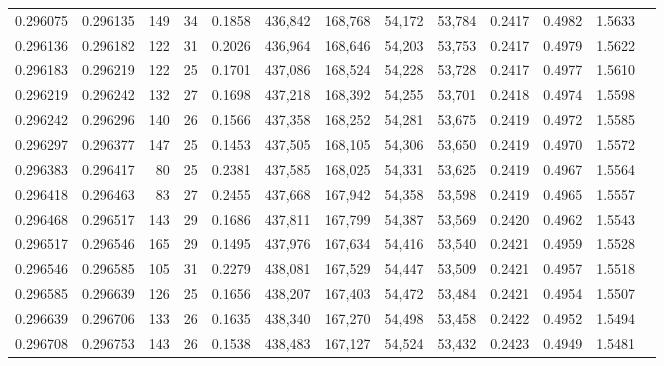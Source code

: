 \begin{tabular}{rrrrrrrrrrrrr}
0.296075 & 0.296135 &   149 &  34 &                                     0.1858 & 436,842 & 168,768 &  54,172 &  53,784 & 0.2417 & 0.4982 & 1.5633 \\
0.296136 & 0.296182 &   122 &  31 &                                     0.2026 & 436,964 & 168,646 &  54,203 &  53,753 & 0.2417 & 0.4979 & 1.5622 \\
0.296183 & 0.296219 &   122 &  25 &                                     0.1701 & 437,086 & 168,524 &  54,228 &  53,728 & 0.2417 & 0.4977 & 1.5610 \\
0.296219 & 0.296242 &   132 &  27 &                                     0.1698 & 437,218 & 168,392 &  54,255 &  53,701 & 0.2418 & 0.4974 & 1.5598 \\
0.296242 & 0.296296 &   140 &  26 &                                     0.1566 & 437,358 & 168,252 &  54,281 &  53,675 & 0.2419 & 0.4972 & 1.5585 \\
0.296297 & 0.296377 &   147 &  25 &                                     0.1453 & 437,505 & 168,105 &  54,306 &  53,650 & 0.2419 & 0.4970 & 1.5572 \\
0.296383 & 0.296417 &    80 &  25 &                                     0.2381 & 437,585 & 168,025 &  54,331 &  53,625 & 0.2419 & 0.4967 & 1.5564 \\
0.296418 & 0.296463 &    83 &  27 &                                     0.2455 & 437,668 & 167,942 &  54,358 &  53,598 & 0.2419 & 0.4965 & 1.5557 \\
0.296468 & 0.296517 &   143 &  29 &                                     0.1686 & 437,811 & 167,799 &  54,387 &  53,569 & 0.2420 & 0.4962 & 1.5543 \\
0.296517 & 0.296546 &   165 &  29 &                                     0.1495 & 437,976 & 167,634 &  54,416 &  53,540 & 0.2421 & 0.4959 & 1.5528 \\
0.296546 & 0.296585 &   105 &  31 &                                     0.2279 & 438,081 & 167,529 &  54,447 &  53,509 & 0.2421 & 0.4957 & 1.5518 \\
0.296585 & 0.296639 &   126 &  25 &                                     0.1656 & 438,207 & 167,403 &  54,472 &  53,484 & 0.2421 & 0.4954 & 1.5507 \\
0.296639 & 0.296706 &   133 &  26 &                                     0.1635 & 438,340 & 167,270 &  54,498 &  53,458 & 0.2422 & 0.4952 & 1.5494 \\
0.296708 & 0.296753 &   143 &  26 &                                     0.1538 & 438,483 & 167,127 &  54,524 &  53,432 & 0.2423 & 0.4949 & 1.5481 \\

\end{tabular}
